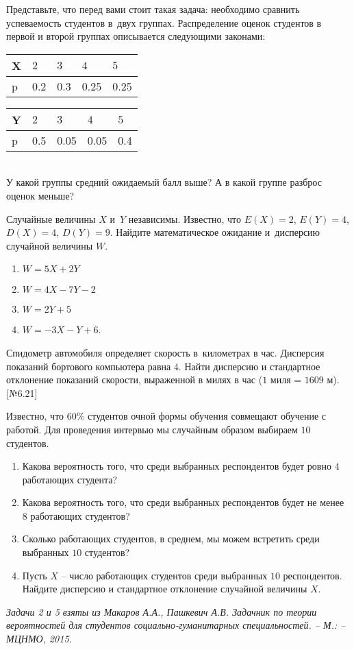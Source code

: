 \documentclass[a4paper, 12pt]{article}
\begin{document}
\begin{problem} 
Представьте, что перед вами стоит такая задача: 
необходимо сравнить успеваемость студентов в~двух 
группах. Распределение оценок студентов в первой и второй
группах описывается следующими законами:
\begin{table}[ht!]
\centering
\begin{tabular}{|l|l|l|l|l|}
\hline
X & $2$    & $3$    & $4$    & $5$    \\ \hline
p & 0.2 & 0.3 & 0.25 & 0.25 \\ \hline
\end{tabular}
\begin{tabular}{|l|l|l|l|l|}
\hline
Y & $2$    & $3$    & $4$    & $5$   \\ \hline
p & 0.5 & 0.05 & 0.05 & 0.4 \\ \hline
\end{tabular}
\end{table}\\
У какой группы средний ожидаемый
балл выше? А в какой группе разброс оценок меньше? 
\end{problem}

\begin{problem} 
Случайные величины $X$ и~$Y$ независимы. Известно, 
что $E(X)=2$, $E(Y)=4$, $D(X)=4$, $D(Y)=9$. Найдите 
математическое ожидание и~дисперсию случайной 
величины $W$.
\begin{multicols}{2}
\begin{enumerate}
\item $W=5X+2Y$
\item $W=4X-7Y-2$
\item $W=2Y+5$
\item $W=-3X-Y+6$.
\end{enumerate}
\end{multicols}
\end{problem}

\begin{problem} 
Спидометр автомобиля определяет скорость в~километрах 
в час. Дисперсия показаний бортового компьютера равна $4$. 
Найти дисперсию и стандартное отклонение показаний скорости, 
выраженной в милях в час ($1$ миля = $1609$ м). [№6.21]
\end{problem}

\begin{problem}
Известно, что $60$\% студентов очной формы обучения совмещают 
обучение с работой. Для проведения интервью мы случайным 
образом выбираем $10$ студентов.
\begin{enumerate}
\item Какова вероятность того, что среди выбранных респондентов 
будет ровно $4$ работающих студента?
\item Какова вероятность того, что среди выбранных респондентов 
будет не менее $8$ работающих студентов?
\item Сколько работающих студентов, в среднем, мы можем встретить 
среди выбранных $10$ студентов?
\item Пусть $X$ -- число работающих студентов среди выбранных $10$ 
респондентов. Найдите дисперсию и стандартное отклонение случайной 
величины $X$.
\end{enumerate}
\end{problem}


\noindent\textit{Задачи 2 и 5 взяты из Макаров А.А., Пашкевич А.В. Задачник по теории вероятностей для 
студентов социально-гуманитарных специальностей. -- М.: -- МЦНМО, 2015.}
\end{document}
